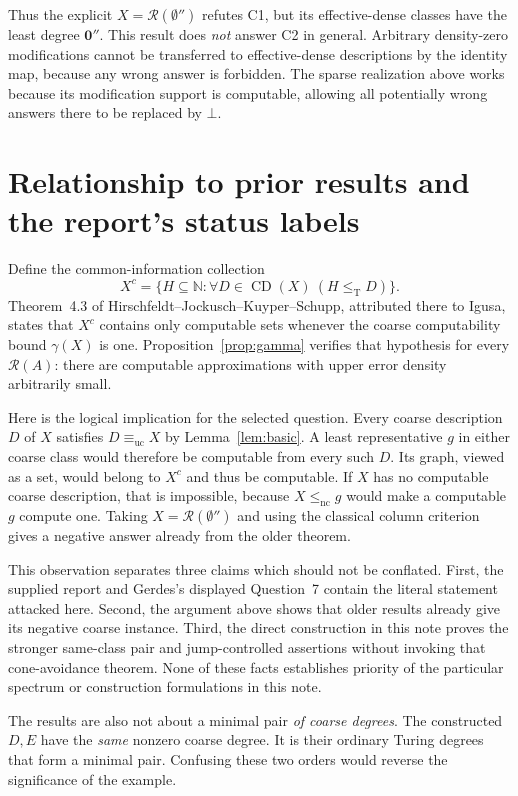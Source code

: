 \documentclass[11pt,a4paper]{article}
\newcommand{\N}{\mathbb N}
\newcommand{\leT}{\leq_{\mathrm T}}
\newcommand{\lenc}{\leq_{\mathrm{nc}}}
\newcommand{\equc}{\equiv_{\mathrm{uc}}}
\newcommand{\CD}{\operatorname{CD}}
\newcommand{\R}{\mathcal R}
\newcommand{\zero}{\mathbf 0}
\theoremstyle{definition}\newtheorem{definition}[theorem]{Definition}
\theoremstyle{remark}\newtheorem{remark}[theorem]{Remark}
\begin{document}
Thus the explicit $X=\R(\emptyset'')$ refutes C1, but its effective-dense classes have the least degree $\zero''$. This result does \emph{not} answer C2 in general. Arbitrary density-zero modifications cannot be transferred to effective-dense descriptions by the identity map, because any wrong answer is forbidden. The sparse realization above works because its modification support is computable, allowing all potentially wrong answers there to be replaced by $\bot$.

\section{Relationship to prior results and the report's status labels}
\label{sec:prior}
Define the common-information collection
\[
 X^c=\{H\subseteq\N:\forall D\in\CD(X)\ (H\leT D)\}.
\]
Theorem~4.3 of Hirschfeldt--Jockusch--Kuyper--Schupp, attributed there to Igusa, states that $X^c$ contains only computable sets whenever the coarse computability bound $\gamma(X)$ is one.\cite{HJKS} Proposition~\ref{prop:gamma} verifies that hypothesis for every $\R(A)$: there are computable approximations with upper error density arbitrarily small.

Here is the logical implication for the selected question. Every coarse description $D$ of $X$ satisfies $D\equc X$ by Lemma~\ref{lem:basic}. A least representative $g$ in either coarse class would therefore be computable from every such $D$. Its graph, viewed as a set, would belong to $X^c$ and thus be computable. If $X$ has no computable coarse description, that is impossible, because $X\lenc g$ would make a computable $g$ compute one. Taking $X=\R(\emptyset'')$ and using the classical column criterion gives a negative answer already from the older theorem.

This observation separates three claims which should not be conflated. First, the supplied report and Gerdes's displayed Question~7 contain the literal statement attacked here. Second, the argument above shows that older results already give its negative coarse instance. Third, the direct construction in this note proves the stronger same-class pair and jump-controlled assertions without invoking that cone-avoidance theorem. None of these facts establishes priority of the particular spectrum or construction formulations in this note.

The results are also not about a minimal pair \emph{of coarse degrees}. The constructed $D,E$ have the \emph{same} nonzero coarse degree. It is their ordinary Turing degrees that form a minimal pair. Confusing these two orders would reverse the significance of the example.
\end{document}
